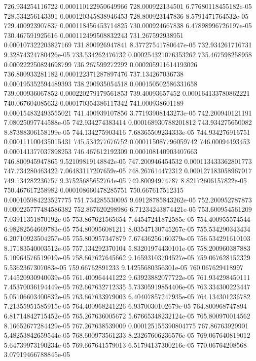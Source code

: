 {726.934254116722 0.000110122950649966
728.000922134501 6.77680118455182e-05
728.534256143391 0.000120345838946453
728.800923147836 8.5791471764532e-05
729.400923907837 0.000118456453714825
730.000924667838 6.47898996726197e-05
730.467591925616 0.000112499508832243
731.267592938951 0.000107322203827169
731.800926947841 8.37727541780647e-05
732.934261716731 9.32874324780426e-05
733.534262476732 0.000254321076353262
735.467598258958 0.000222250824698799
736.267599272292 0.000205911614193026
736.800933281182 0.000122371287897476
737.134267036738 0.000195352594489393
738.200935054518 0.000150502586331658
739.000936067852 0.000220279179561853
739.40093657452 0.000164133780862221
740.067604085632 0.000170354386117342
741.000938601189 0.000154832493555021
741.400939107856 3.77193908143273e-05
742.200940121191 7.08025097744588e-05
742.934274383414 0.000168930788201812
743.934275650082 8.87388306158199e-05
744.134275903416 7.68365509234333e-05
744.934276916751 0.000111100435015431
745.534277676752 0.000115087796059742
746.00094493453 0.000141377037898253
746.467612192309 0.000108140903407663
746.800945947865 9.52109819148842e-05
747.200946454532 0.000113433362801773
747.734280463422 7.06483117207659e-05
748.267614472312 0.000127183058967017
749.134282236757 9.37525685652764e-05
749.80094974787 8.82172606157822e-05
750.467617258982 0.000108660478285751
750.667617512315 0.000105984223527775
751.734285530095 9.69128785843262e-05
752.200952787873 0.000225777484586382
752.867620298986 6.71234243874421e-05
753.600954561209 7.03911351870192e-05
753.867621565654 7.44547241872585e-05
754.400955574544 6.98282564669783e-05
754.800956081211 8.03547130745267e-05
755.534290343434 6.20710923504257e-05
755.800957347879 7.67436256160379e-05
756.534291610103 8.17183540003512e-05
757.134292370104 5.83201974430101e-05
758.200960387883 5.10964576519019e-05
758.667627645662 9.16593103704527e-05
759.067628152329 5.5362367307083e-05
759.66762891233 9.14255680356301e-05
760.067629418997 7.44520930940039e-05
761.400964441222 9.63923882077722e-05
761.934298450111 7.45370036194449e-05
762.667632712335 5.73305919854406e-05
763.334300223447 5.05106603400832e-05
763.667633979003 6.40407857247935e-05
764.134301236782 7.21355951585915e-05
764.400968241226 6.9370030102679e-05
764.800968747894 6.81714842715452e-05
765.267636005672 5.67665348232124e-05
765.800970014562 8.16652677284429e-05
767.267638539009 0.000125155390804775
767.86763929901 5.48253842659544e-05
768.600973561233 8.23267606236576e-05
769.067640819012 5.64739973190234e-05
769.667641579013 6.51794137300216e-05
770.06764208568 3.07919466788845e-05
}
